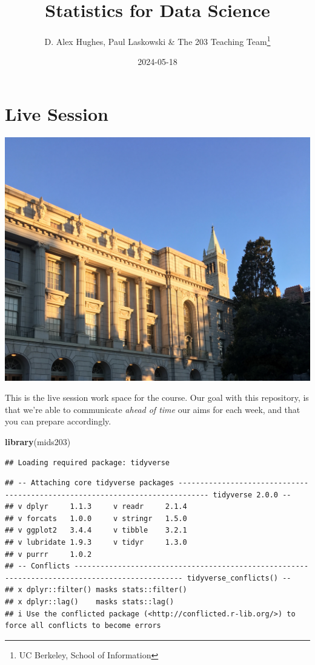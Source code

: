 \documentclass[
]{book}
\title{Statistics for Data Science}
\author{D. Alex Hughes, Paul Laskowski \& The 203 Teaching Team\footnote{UC Berkeley, School of Information}}
\date{2024-05-18}
\newenvironment{Shaded}{\begin{snugshade}}{\end{snugshade}}
\newcommand{\FunctionTok}[1]{\textcolor[rgb]{0.13,0.29,0.53}{\textbf{#1}}}
\newcommand{\NormalTok}[1]{#1}
\theoremstyle{definition}
\theoremstyle{definition}
\theoremstyle{definition}
\theoremstyle{definition}
\theoremstyle{remark}
\begin{document}
\maketitle

{
\setcounter{tocdepth}{1}
\tableofcontents
}
\hypertarget{live-session}{%
\chapter*{Live Session}\label{live-session}}

\includegraphics{./images/campus.jpeg}

This is the live session work space for the course. Our goal with this repository, is that we're able to communicate \emph{ahead of time} our aims for each week, and that you can prepare accordingly.

\begin{Shaded}
\begin{Highlighting}[]
\FunctionTok{library}\NormalTok{(mids203)}
\end{Highlighting}
\end{Shaded}

\begin{verbatim}
## Loading required package: tidyverse
\end{verbatim}

\begin{verbatim}
## -- Attaching core tidyverse packages ----------------------------------------------------------------------------- tidyverse 2.0.0 --
## v dplyr     1.1.3     v readr     2.1.4
## v forcats   1.0.0     v stringr   1.5.0
## v ggplot2   3.4.4     v tibble    3.2.1
## v lubridate 1.9.3     v tidyr     1.3.0
## v purrr     1.0.2     
## -- Conflicts ----------------------------------------------------------------------------------------------- tidyverse_conflicts() --
## x dplyr::filter() masks stats::filter()
## x dplyr::lag()    masks stats::lag()
## i Use the conflicted package (<http://conflicted.r-lib.org/>) to force all conflicts to become errors
\end{verbatim}
\end{document}
